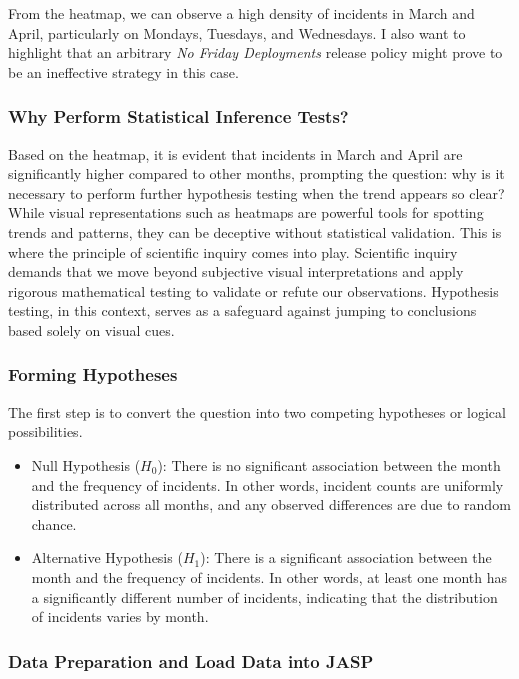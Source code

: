 \documentclass{article}
\begin{document}
From the heatmap, we can observe a high density of incidents in March and April, particularly on Mondays, Tuesdays, and Wednesdays. I also want to highlight that an arbitrary \textit{No Friday Deployments} release policy might prove to be an ineffective strategy in this case. 

\subsubsection{Why Perform Statistical Inference Tests?}

Based on the heatmap, it is evident that incidents in March and April are significantly higher compared to other months, prompting the question: why is it necessary to perform further hypothesis testing when the trend appears so clear? While visual representations such as heatmaps are powerful tools for spotting trends and patterns, they can be deceptive without statistical validation. This is where the principle of scientific inquiry comes into play. Scientific inquiry demands that we move beyond subjective visual interpretations and apply rigorous mathematical testing to validate or refute our observations. Hypothesis testing, in this context, serves as a safeguard against jumping to conclusions based solely on visual cues.

\subsubsection{Forming Hypotheses}

The first step is to convert the question into two competing hypotheses or logical possibilities.
\begin{itemize}
    \item Null Hypothesis ($H_0$): There is no significant association between the month and the frequency of incidents. In other words, incident counts are uniformly distributed across all months, and any observed differences are due to random chance.

    \item Alternative Hypothesis ($H_1$): There is a significant association between the month and the frequency of incidents. In other words, at least one month has a significantly different number of incidents, indicating that the distribution of incidents varies by month.
\end{itemize}


\subsubsection{Data Preparation and Load Data into JASP}
\end{document}
